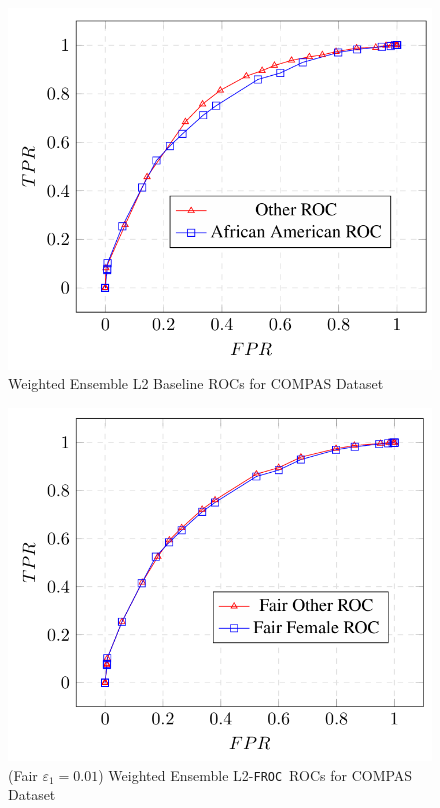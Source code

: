 \documentclass{article}
\newcommand{\ouralgo}{\texttt{FROC}}
\begin{document}
\begin{figure}[!h]
    \centering
    \includegraphics[width=1\linewidth]{Images/WEL2_COMPAS_Baseline_ROC.png}
    \caption{Weighted Ensemble L2 Baseline ROCs for COMPAS Dataset}
    \label{fig:WEL2_COMPAS_ROC}
\end{figure}

\begin{figure}[!h]
    \centering
    \includegraphics[width=1\linewidth]{Images/WEL2_COMPAS_Baseline_ROC_FROC.png}
    \caption{(Fair $\varepsilon_1 = 0.01$) Weighted Ensemble L2-\ouralgo\   ROCs for COMPAS Dataset}
    \label{fig:WEL2_COMPAS_ROC_FROC}
\end{figure}
\end{document}
